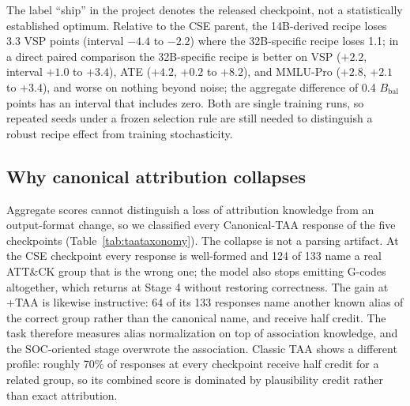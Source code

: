 \documentclass[twocolumn]{svjour3}
\newcommand{\Bbal}{B_{\mathrm{bal}}}
\begin{document}
The label ``ship'' in the project denotes the released checkpoint, not a statistically established optimum. Relative to the CSE parent, the 14B-derived recipe loses 3.3 VSP points (interval $-4.4$ to $-2.2$) where the 32B-specific recipe loses 1.1; in a direct paired comparison the 32B-specific recipe is better on VSP ($+2.2$, interval $+1.0$ to $+3.4$), ATE ($+4.2$, $+0.2$ to $+8.2$), and MMLU-Pro ($+2.8$, $+2.1$ to $+3.4$), and worse on nothing beyond noise; the aggregate difference of 0.4 $\Bbal$ points has an interval that includes zero. Both are single training runs, so repeated seeds under a frozen selection rule are still needed to distinguish a robust recipe effect from training stochasticity.

\subsection{Why canonical attribution collapses}\label{sec:cseshard}
Aggregate scores cannot distinguish a loss of attribution knowledge from an output-format change, so we classified every Canonical-TAA response of the five checkpoints (Table~\ref{tab:taataxonomy}). The collapse is not a parsing artifact. At the CSE checkpoint every response is well-formed and 124 of 133 name a real ATT\&CK group that is the wrong one; the model also stops emitting G-codes altogether, which returns at Stage 4 without restoring correctness. The gain at +TAA is likewise instructive: 64 of its 133 responses name another known alias of the correct group rather than the canonical name, and receive half credit. The task therefore measures alias normalization on top of association knowledge, and the SOC-oriented stage overwrote the association. Classic TAA shows a different profile: roughly 70\% of responses at every checkpoint receive half credit for a related group, so its combined score is dominated by plausibility credit rather than exact attribution.
\end{document}
